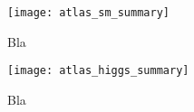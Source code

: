 \begin{figure}[!h]
  \centering
  \texttt{[image: atlas\_sm\_summary]}
  \caption{Bla}
  \label{fig:sm_summary_plot}
\end{figure}
\begin{figure}[!h]
  \centering
  \texttt{[image: atlas\_higgs\_summary]}
  \caption{Bla}
  \label{fig:sm_summary_plot}
\end{figure}
